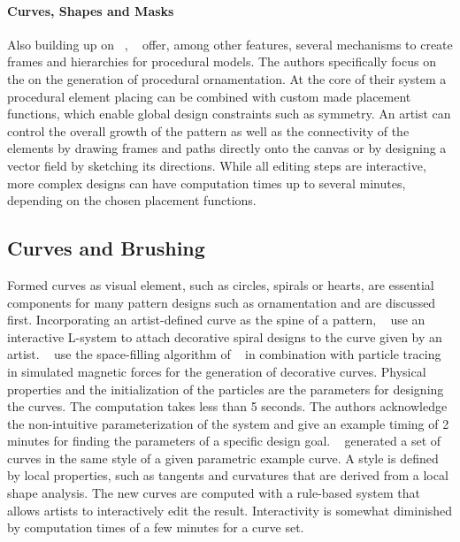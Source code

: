 {\paragraph*{Curves, Shapes and Masks} Also building up on \citeauthor*{wong_1998_cgf}~\cite{wong_1998_cgf}, \citeauthor*{gieseke_2017_ooo}~\cite{gieseke_2017_ooo} offer, among other features, several mechanisms to create frames and hierarchies for procedural models. The authors specifically focus on the on the generation of procedural ornamentation. At the core of their system a procedural element placing can be combined with custom made placement functions, which enable global design constraints such as symmetry. An artist can control the overall growth of the pattern as well as the connectivity of the elements by drawing frames and paths directly onto the canvas or by designing a vector field by sketching its directions. While all editing steps are interactive, more complex designs can have computation times up to several minutes, depending on the chosen placement functions.}


\subsection{Curves and Brushing}
\label{subsec:analysis_curves}


Formed curves as visual element, such as circles, spirals or hearts, are essential components for many pattern designs such as ornamentation and are discussed first. Incorporating an artist-defined curve as the spine of a pattern, \citeauthor*{yu_2012_ans}~\cite{yu_2012_ans} use an interactive L-system to attach decorative spiral designs to the curve given by an artist. \citeauthor*{xu_2009_mcc}~\cite{xu_2009_mcc} use the space-filling algorithm of \citeauthor*{wong_1998_cgf}~\cite{wong_1998_cgf} in combination with particle tracing in simulated magnetic forces for the generation of decorative curves. Physical properties and the initialization of the particles are the parameters for designing the curves. The computation takes less than 5 seconds. The authors acknowledge the non-intuitive parameterization of the system and give an example timing of 2 minutes for finding the parameters of a specific design goal. \citeauthor*{merrell_2010_ecs}~\cite{merrell_2010_ecs} generated a set of curves in the same style of a given parametric example curve. A style is defined by local properties, such as tangents and curvatures that are derived from a local shape analysis. The new curves are computed with a rule-based system that allows artists to interactively edit the result. Interactivity is somewhat diminished by computation times of a few minutes for a curve set. 

